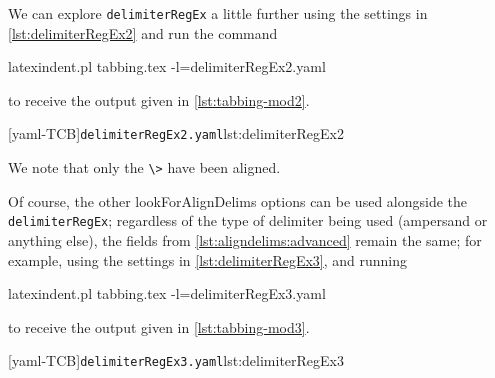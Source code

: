 \documentclass[10pt]{article}
\begin{document}
 \begin{example}
 We can explore \texttt{delimiterRegEx} a little further using the settings in
 \cref{lst:delimiterRegEx2} and run the command 

 \begin{commandshell}
latexindent.pl tabbing.tex -l=delimiterRegEx2.yaml
\end{commandshell}

 to receive the output given in \cref{lst:tabbing-mod2}. 

 \begin{cmhtcbraster}
  [yaml-TCB]{\texttt{delimiterRegEx2.yaml}}{lst:delimiterRegEx2}
 \end{cmhtcbraster}
 We note that only the \lstinline!\>! have been aligned.
 \end{example}

 \begin{example}
 Of course, the other lookForAlignDelims options can be used alongside the
 \texttt{delimiterRegEx}; regardless of the type of delimiter being used (ampersand or
 anything else), the fields from \vref{lst:aligndelims:advanced} remain the same; for
 example, using the settings in \cref{lst:delimiterRegEx3}, and running

 \begin{commandshell}
latexindent.pl tabbing.tex -l=delimiterRegEx3.yaml
\end{commandshell}

 to receive the output given in \cref{lst:tabbing-mod3}.

 \begin{cmhtcbraster}
  [yaml-TCB]{\texttt{delimiterRegEx3.yaml}}{lst:delimiterRegEx3}
 \end{cmhtcbraster}
 \end{example}
\end{document}
